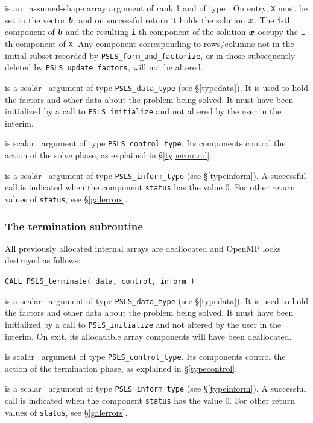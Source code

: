 \documentclass{galahad}
\newcommand{\packagename}{PSLS}
\begin{document}
\begin{description}

 is an \intentinout\ assumed-shape array argument of rank 1
and of type \realdp.  On entry, {\tt X} must be set
to the vector ${\bm{b}}$, and on successful return it holds
the solution ${\bm{x}}$. The {\tt i}-th component of ${\bm{b}}$ and the resulting
{\tt i}-th component of the solution ${\bm{x}}$
occupy the {\tt i}-th component of {\tt X}. 
Any component corresponding to rows/columns not in the initial subset
recorded by {\tt  \packagename\_form\_and\_factorize},
or in those subsequently deleted
by {\tt \packagename\_update\_factors}, will not be altered.

 is a scalar \intentinout\ argument of type
{\tt \packagename\_data\_type}
(see \S\ref{typedata}). It is used to hold the factors and other
data about the problem being solved.
It must have been initialized by a call to
{\tt \packagename\_ini\-tialize} and not altered by the user in the interim.

 is scalar \intentin\ argument of type
{\tt \packagename\_control\_type}. Its components control the action
of the solve phase, as explained in
\S\ref{typecontrol}.

 is a scalar \intentinout\ argument of type
{\tt \packagename\_inform\_type}
(see \S\ref{typeinform}).
A successful call is indicated when the  component {\tt status} has the value 0.
For other return values of {\tt status}, see \S\ref{galerrors}.

\end{description}


\subsubsection{The termination subroutine}
All previously allocated internal arrays are deallocated and OpenMP locks
destroyed as follows:

\hskip0.5in
{\tt CALL \packagename\_terminate( data, control, inform )}

\begin{description}

 is a scalar \intentinout\ argument of type
{\tt \packagename\_data\_type}
(see \S\ref{typedata}). It is used to hold the factors and other
data about the problem being solved.
It must have been initialized by a call to
{\tt \packagename\_ini\-tialize} and not altered by the user in the interim.
On exit, its allocatable array components will have been deallocated.

 is scalar \intentin\ argument of type
{\tt \packagename\_control\_type}. Its components control the action
of the termination phase, as explained in
\S\ref{typecontrol}.

 is a scalar \intentinout\ argument of type
{\tt \packagename\_inform\_type}
(see \S\ref{typeinform}).
A successful call is indicated when the  component {\tt status} has the value 0.
For other return values of {\tt status}, see \S\ref{galerrors}.

\end{description}
\end{document}
